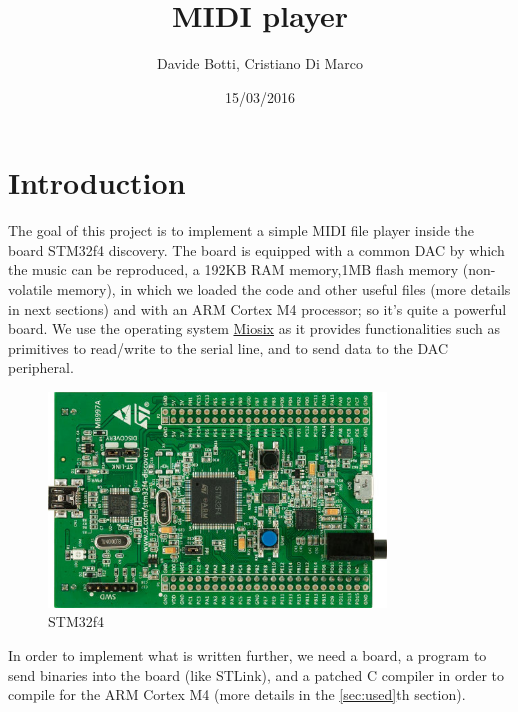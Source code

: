 \documentclass[12pt]{article}
\title{MIDI player}
\date{15/03/2016}
\author{Davide Botti, Cristiano Di Marco}
\begin{document}
\maketitle
{}
\pagestyle{fancy}
\fancyhead{}
\fancyfoot{}
\fancyfoot[R]{\thepage}
\newpage
{}
\tableofcontents

\newpage
\section{Introduction} \label{sec:intro}
 The goal of this project is to implement a simple MIDI file player inside the board STM32f4 discovery. The board is equipped with a common DAC by which the music can be reproduced, a 192KB RAM memory,1MB flash memory (non-volatile memory), in which we loaded the code and other useful files (more details in next sections) and with an ARM Cortex M4 processor; so it's quite a powerful board. We use the operating system \href{https://miosix.org/}{Miosix} as it provides functionalities such as primitives to read/write to the serial line, and to send data to the DAC peripheral.\newline
 \begin{figure}[H]
 	\includegraphics[width=0.8\textwidth]{STM32F4-Discovery-Board.jpg}
 	\caption{STM32f4}
 	\label{fig:STM32f4Discovery}
 \end{figure}
In order to implement what is written further, we need a board, a program to send binaries into the board (like STLink), and a patched C compiler in order to compile for the ARM Cortex M4 (more details in the \ref{sec:used}th section).
\newpage
\end{document}
